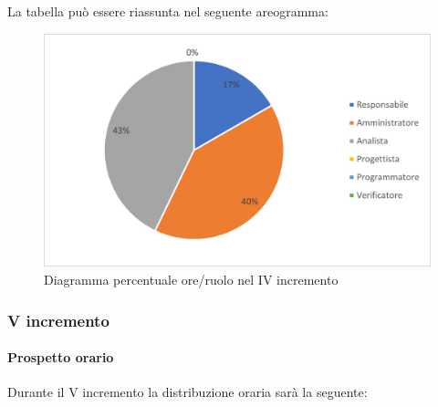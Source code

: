 La tabella può essere riassunta nel seguente areogramma:
\begin{figure}[H]
	\centering
	\includegraphics[width=0.8\linewidth]{res/images/preventivo/dettaglio_analisi/1-2.png}
	\caption{Diagramma percentuale ore/ruolo nel IV incremento}
	\label{fig:diagramma costi ruolo  IV incremento}
\end{figure}

\subsubsection{V incremento}
\paragraph{Prospetto orario}
Durante il V incremento la distribuzione oraria sarà la seguente:

